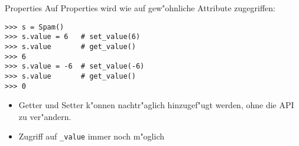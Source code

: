 \begin{frame}[fragile]{Properties}
Auf Properties wird wie auf gew"ohnliche Attribute zugegriffen:
\begin{lstlisting}[style=Shell]
>>> s = Spam()
>>> s.value = 6   # set_value(6)
>>> s.value       # get_value()
>>> 6
>>> s.value = -6  # set_value(-6)
>>> s.value       # get_value()
>>> 0
\end{lstlisting}
\begin{itemize}
\item Getter und Setter k"onnen nachtr"aglich hinzugef"ugt werden, ohne die API zu ver"andern.
\item Zugriff auf \lstinline{_value} immer noch m"oglich
\end{itemize}

\end{frame}


